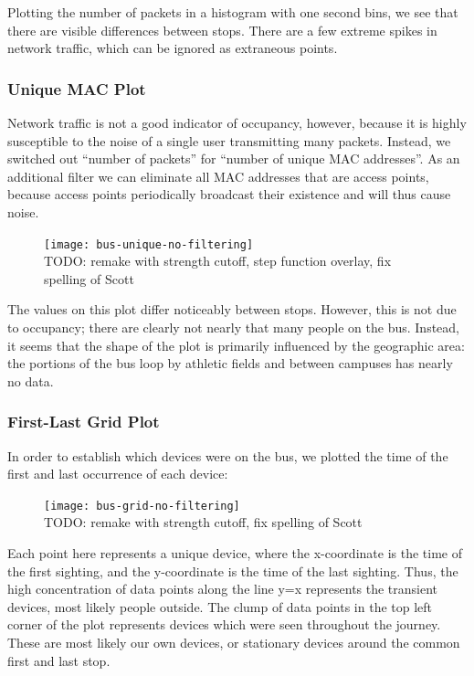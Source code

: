 \documentclass[letterpaper,abstract=on,titlepage=false]{scrreprt}
\begin{document}
		Plotting the number of packets in a histogram with one second bins, we see that there are visible differences between stops.
		There are a few extreme spikes in network traffic, which can be ignored as extraneous points.
	
	\subsubsection*{Unique MAC Plot}

		Network traffic is not a good indicator of occupancy, however, because it is highly susceptible to the noise of a single user transmitting many packets.
		Instead, we switched out ``number of packets'' for ``number of unique MAC addresses''.
		As an additional filter we can eliminate all MAC addresses that are access points, because access points periodically broadcast their existence and will thus cause noise.

		\begin{figure}[H]
		\texttt{[image: bus-unique-no-filtering]}
		\\TODO: remake with strength cutoff, step function overlay, fix spelling of Scott
		\centering
		\end{figure}

		The values on this plot differ noticeably between stops.
		However, this is not due to occupancy; there are clearly not nearly that many people on the bus.
		Instead, it seems that the shape of the plot is primarily influenced by the geographic area: the portions of the bus loop by athletic fields and between campuses has nearly no data.

	\subsubsection*{First-Last Grid Plot}
		In order to establish which devices were on the bus, we plotted the time of the first and last occurrence of each device:

		\begin{figure}[H]
		\texttt{[image: bus-grid-no-filtering]}
		\\TODO: remake with strength cutoff, fix spelling of Scott
		\centering
		\end{figure}

		Each point here represents a unique device, where the x-coordinate is the time of the first sighting, and the y-coordinate is the time of the last sighting.
		Thus, the high concentration of data points along the line y=x represents the transient devices, most likely people outside.
		The clump of data points in the top left corner of the plot represents devices which were seen throughout the journey. 
		These are most likely our own devices, or stationary devices around the common first and last stop.
\end{document}
